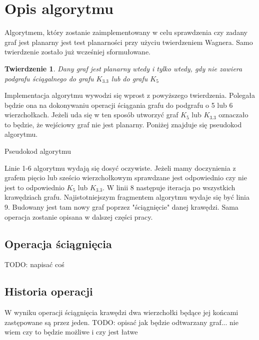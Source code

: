 \documentclass[a4 122pt]{article}
\newtheorem{twierdzenie}{Twierdzenie}
\begin{document}
	\section{Opis algorytmu}	
	Algorytmem, który zostanie zaimplementowany w celu sprawdzenia czy zadany graf jest planarny jest test planarności przy użyciu twierdzeniem Wagnera. 
	Samo twierdzenie zostało już wcześniej sformułowane. 
	\begin{twierdzenie}
	Dany graf jest planarny wtedy i tylko wtedy, gdy nie zawiera podgrafu ściągalnego do grafu $K_{3.3}$ lub do grafu $ K_5 $
	\end{twierdzenie}
	Implementacja algorytmu wywodzi się wprost z powyższego twierdzenia. 
	Polegała będzie ona na dokonywaniu operacji ściągania grafu do podgrafu o 5 lub 6 wierzchołkach.
	Jeżeli uda się w ten sposób utworzyć graf $ K_5 $ lub $K_{3.3}$ oznaczało to będzie, że wejściowy graf nie jest planarny.
	Poniżej znajduje się pseudokod algorytmu.
	
	
	\begin{algorithm}[H]
	\DontPrintSemicolon
	\LinesNumbered
	\newcommand{\forcond}{$i=0$ \KwTo $n$}
	\caption{Pseudokod algorytmu}
	\end{algorithm}
	
	Linie 1-6 algorytmu wydają się dosyć oczywiste. Jeżeli mamy doczynienia z grafem pięcio lub sześcio wierzchołkowym sprawdzane 
	jest odpowiednio czy nie jest to odpowiednio $K_5$ lub $K_3.3$. W linii 8 następuje iteracja po wszystkich krawędziach grafu. 
	Najistotniejszym fragmentem algorytmu wydaje się być linia 9. Budowany jest tam nowy graf poprzez "ściągnięcie" danej krawędzi. 
	Sama operacja zostanie opisana w dalszej części pracy.
	
	\subsection{Operacja ściągnięcia}
	TODO: napisać coś
	
	\subsection{Historia operacji}
	W wyniku operacji ściągnięcia krawędzi dwa wierzchołki będące jej końcami zastępowane są przez jeden. 
	TODO: opisać jak będzie odtwarzany graf... nie wiem czy to będzie możliwe i czy jest łatwe
\end{document}
